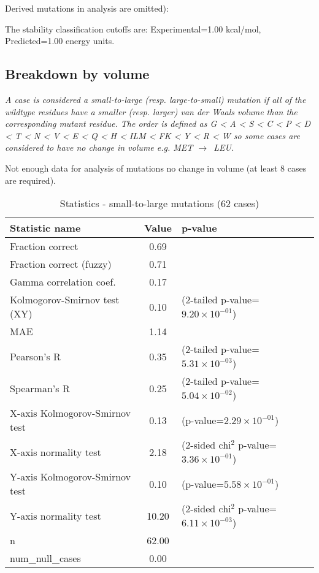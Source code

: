 \documentclass[10pt, letterpaper, oneside, titlepage, landscape]{scrreprt}
\begin{document}
Derived mutations in analysis are omitted):

The stability classification cutoffs are: Experimental=1.00 kcal/mol, Predicted=1.00 energy units.
\subsection{Breakdown by volume}
\textit{A case is considered a small-to-large (resp. large-to-small) mutation if all of the wildtype residues have a smaller (resp. larger) van der Waals volume than the corresponding mutant residue. The order is defined as G < A < S < C < P < D < T < N < V < E < Q < H < ILM < FK < Y < R < W so some cases are considered to have no change in volume e.g. MET $\rightarrow$\ LEU.}

Not enough data for analysis of mutations no change in volume (at least 8 cases are required).


\begin{table}[H]\begin{center}
\begin{tabular}{ l S[table-format=3.2] l}
Statistic name & {Value} & p-value\\
\hline
Fraction correct & 0.69 & \\
Fraction correct (fuzzy) & 0.71 & \\
Gamma correlation coef. & 0.17 & \\
Kolmogorov-Smirnov test (XY) & 0.10 & (2-tailed p-value=$9.20\times10^{-01}$)\\
MAE & 1.14 & \\
Pearson's R & 0.35 & (2-tailed p-value=$5.31\times10^{-03}$)\\
Spearman's R & 0.25 & (2-tailed p-value=$5.04\times10^{-02}$)\\
X-axis Kolmogorov-Smirnov test & 0.13 & (p-value=$2.29\times10^{-01}$)\\
X-axis normality test & 2.18 & (2-sided chi$^{2}$ p-value=$3.36\times10^{-01}$)\\
Y-axis Kolmogorov-Smirnov test & 0.10 & (p-value=$5.58\times10^{-01}$)\\
Y-axis normality test & 10.20 & (2-sided chi$^{2}$ p-value=$6.11\times10^{-03}$)\\
n & 62.00 & \\
num\_null\_cases & 0.00 & \\
\end{tabular}
\caption{Statistics - small-to-large mutations (62 cases)}
\end{center}\end{table}
\end{document}
